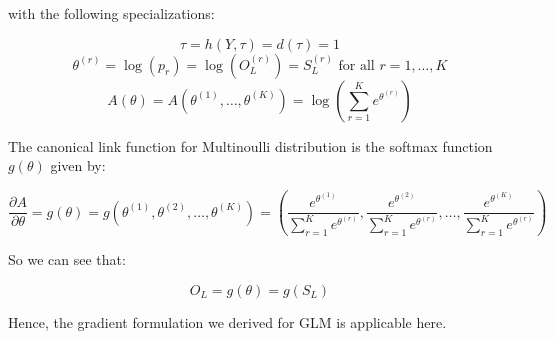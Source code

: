 \documentclass[10pt]{amsart}
\begin{document}
with the following specializations:

$$\tau = h(Y, \tau) = d(\tau) = 1$$
$$\theta^{(r)} = \log{(p_r)} = \log{(O_L^{(r)})} = S_L^{(r)} \mbox{ for all $r = 1, \ldots, K$}$$
$$A(\theta) = A(\theta^{(1)}, \ldots, \theta^{(K)}) = \log{(\sum_{r=1}^K e^{\theta^{(r)}})}$$

The canonical link function for Multinoulli distribution is the softmax function $g(\theta)$ given by:

$$\frac {\partial A} {\partial \theta} = g(\theta) = g(\theta^{(1)}, \theta^{(2)}, \ldots, \theta^{(K)}) = (\frac {e^{\theta^{(1)}}} {\sum_{r=1}^K e^{\theta^{(r)}}}, \frac {e^{\theta^{(2)}}} {\sum_{r=1}^K e^{\theta^{(r)}}}, \ldots, \frac {e^{\theta^{(K)}}} {\sum_{r=1}^K e^{\theta^{(r)}}})$$

So we can see that:

$$O_L = g(\theta) = g(S_L)$$

Hence, the gradient formulation we derived for GLM is applicable here.
\end{document}
